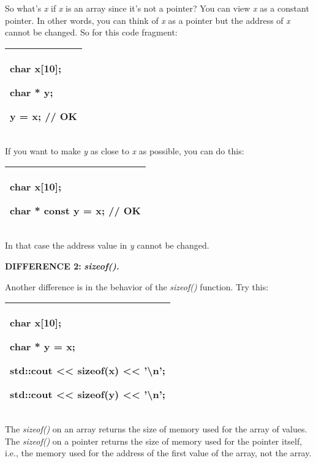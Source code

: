 \documentclass[
]{article}
\begin{document}
So what's \emph{x} if \emph{x} is an array since it's not a pointer? You
can view \emph{x} as a constant pointer. In other words, you can think
of \emph{x} as a pointer but the address of \emph{x} cannot be changed.
So for this code fragment:

\begin{longtable}[]{@{}l@{}}
\toprule
\endhead
\begin{minipage}[t]{0.97\columnwidth}\raggedright
char x{[}10{]};

char * y;

y = x; // OK\strut
\end{minipage}\tabularnewline
\bottomrule
\end{longtable}

If you want to make \emph{y} as close to \emph{x} as possible, you can
do this:

\begin{longtable}[]{@{}l@{}}
\toprule
\endhead
\begin{minipage}[t]{0.97\columnwidth}\raggedright
char x{[}10{]};

char * const y = x; // OK\strut
\end{minipage}\tabularnewline
\bottomrule
\end{longtable}

In that case the address value in \emph{y} cannot be changed.

\textbf{DIFFERENCE 2:}\emph{\textbf{ }\textbf{sizeof().}}

Another difference is in the behavior of the \emph{sizeof()} function.
Try this:

\begin{longtable}[]{@{}l@{}}
\toprule
\endhead
\begin{minipage}[t]{0.97\columnwidth}\raggedright
char x{[}10{]};

char * y = x;

std::cout \textless\textless{} sizeof(x) \textless\textless{}
'\textbackslash n';

std::cout \textless\textless{} sizeof(y) \textless\textless{}
'\textbackslash n';\strut
\end{minipage}\tabularnewline
\bottomrule
\end{longtable}

The \emph{sizeof()} on an array returns the size of memory used for the
array of values. The \emph{sizeof()} on a pointer returns the size of
memory used for the pointer itself, i.e., the memory used for the
address of the first value of the array, not the array.
\end{document}
